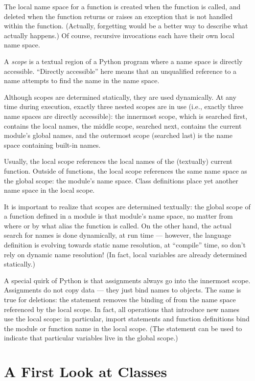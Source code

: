\documentclass{manual}
\begin{document}
The local name space for a function is created when the function is
called, and deleted when the function returns or raises an exception
that is not handled within the function.  (Actually, forgetting would
be a better way to describe what actually happens.)  Of course,
recursive invocations each have their own local name space.

A \emph{scope} is a textual region of a Python program where a name space
is directly accessible.  ``Directly accessible'' here means that an
unqualified reference to a name attempts to find the name in the name
space.

Although scopes are determined statically, they are used dynamically.
At any time during execution, exactly three nested scopes are in use
(i.e., exactly three name spaces are directly accessible): the
innermost scope, which is searched first, contains the local names,
the middle scope, searched next, contains the current module's global
names, and the outermost scope (searched last) is the name space
containing built-in names.

Usually, the local scope references the local names of the (textually)
current function.  Outside of functions, the local scope references
the same name space as the global scope: the module's name space.
Class definitions place yet another name space in the local scope.

It is important to realize that scopes are determined textually: the
global scope of a function defined in a module is that module's name
space, no matter from where or by what alias the function is called.
On the other hand, the actual search for names is done dynamically, at
run time --- however, the language definition is evolving towards
static name resolution, at ``compile'' time, so don't rely on dynamic
name resolution!  (In fact, local variables are already determined
statically.)

A special quirk of Python is that assignments always go into the
innermost scope.  Assignments do not copy data --- they just
bind names to objects.  The same is true for deletions: the statement
 removes the binding of  from the name space
referenced by the local scope.  In fact, all operations that introduce
new names use the local scope: in particular, import statements and
function definitions bind the module or function name in the local
scope.  (The  statement can be used to indicate that
particular variables live in the global scope.)


\section{A First Look at Classes \label{firstClasses}}
\end{document}
